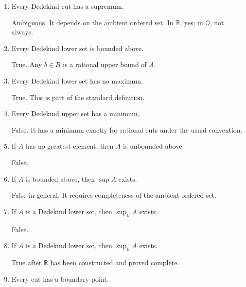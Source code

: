 \documentclass{self-check}
\begin{document}
\begin{enumerate}[label=\arabic{*}., itemsep=10pt]
  \item Every Dedekind cut has a supremum.

    \begin{answer}
      Ambiguous. It depends on the ambient ordered set. In \(\mathbb{R}\), yes; in \(\mathbb{Q}\), not always.
    \end{answer}
  \item Every Dedekind lower set is bounded above.

    \begin{answer}
      True. Any \(b\in B\) is a rational upper bound of \(A\).
    \end{answer}
  \item Every Dedekind lower set has no maximum.

    \begin{answer}
      True. This is part of the standard definition.
    \end{answer}
  \item Every Dedekind upper set has a minimum.

    \begin{answer}
      False. It has a minimum exactly for rational cuts under the usual convention.
    \end{answer}
  \item If \(A\) has no greatest element, then \(A\) is unbounded above.

    \begin{answer}
      False.
    \end{answer}
  \item If \(A\) is bounded above, then \(\sup A\) exists.

    \begin{answer}
      False in general. It requires completeness of the ambient ordered set.
    \end{answer}
  \item If \(A\) is a Dedekind lower set, then \(\sup_{\mathbb{Q}}A\) exists.

    \begin{answer}
      False.
    \end{answer}
  \item If \(A\) is a Dedekind lower set, then \(\sup_{\mathbb{R}}A\) exists.

    \begin{answer}
      True after \(\mathbb{R}\) has been constructed and proved complete.
    \end{answer}
  \item Every cut has a boundary point.


\end{enumerate}
\end{document}
